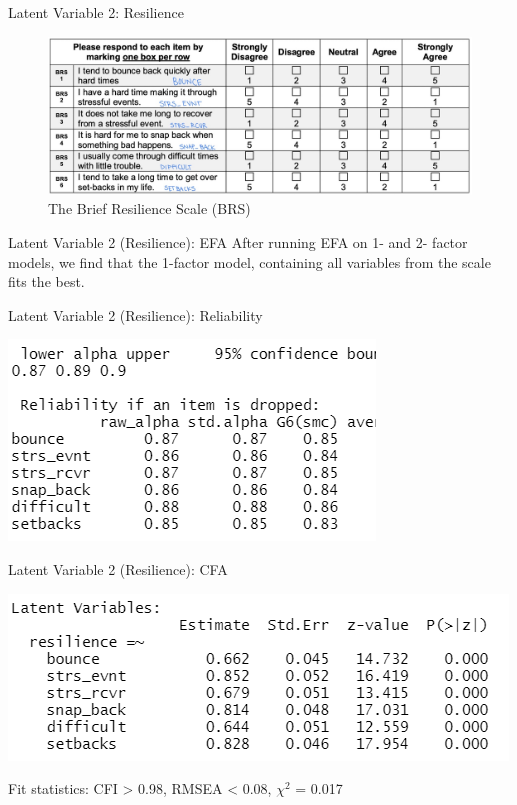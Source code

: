 \documentclass[
  ignorenonframetext,
]{beamer}
\begin{document}
\begin{frame}{Latent Variable 2: Resilience}
\protect\hypertarget{latent-variable-2-resilience}{}
\centering

\begin{figure}
\centering
\includegraphics{images/resilience_annotated.jpg}
\caption{The Brief Resilience Scale (BRS)}
\end{figure}
\end{frame}

\begin{frame}{Latent Variable 2 (Resilience): EFA}
\protect\hypertarget{latent-variable-2-resilience-efa}{}
After running EFA on 1- and 2- factor models, we find that the 1-factor
model, containing all variables from the scale fits the best.
\end{frame}

\begin{frame}{Latent Variable 2 (Resilience): Reliability}
\protect\hypertarget{latent-variable-2-resilience-reliability}{}
\centering

\includegraphics{images/resilience_reliability.png}
\end{frame}

\begin{frame}{Latent Variable 2 (Resilience): CFA}
\protect\hypertarget{latent-variable-2-resilience-cfa}{}
\centering

\includegraphics{images/resilience_cfa.png}

Fit statistics: CFI \textgreater{} 0.98, RMSEA \textless{} 0.08,
\(\chi^2\) = 0.017
\end{frame}
\end{document}
